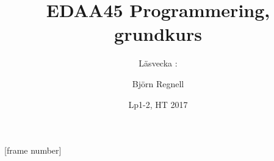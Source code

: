 [frame number]
\title[Föreläsningsanteckningar EDAA45, 2016]{EDAA45 Programmering, grundkurs}
\subtitle{Läsvecka \vecka: \veckotema}
\author{Björn Regnell}
\date{Lp1-2, HT 2017}


